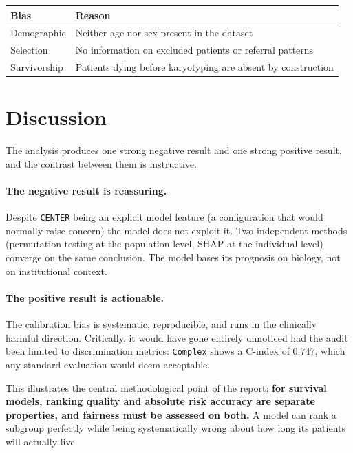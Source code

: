 \documentclass[11pt,a4paper]{article}
\newcommand{\var}[1]{\texttt{#1}}                      %
\begin{document}
\begin{table}[h]
\centering
\begin{tabular}{@{}p{4.5cm} p{9cm}@{}}
\toprule
\textbf{Bias} & \textbf{Reason} \\
\midrule
Demographic & Neither age nor sex present in the dataset \\
Selection & No information on excluded patients or referral patterns \\
Survivorship & Patients dying before karyotyping are absent by construction \\
\bottomrule
\end{tabular}
\end{table}

\section{Discussion}

The analysis produces one strong negative result and one strong positive result, and the
contrast between them is instructive.

\paragraph{The negative result is reassuring.}
Despite \var{CENTER} being an explicit model feature (a configuration that would normally
raise concern) the model does not exploit it. Two independent methods (permutation testing
at the population level, SHAP at the individual level) converge on the same conclusion. The
model bases its prognosis on biology, not on institutional context.

\paragraph{The positive result is actionable.}
The calibration bias is systematic, reproducible, and runs in the clinically harmful direction.
Critically, it would have gone entirely unnoticed had the audit been limited to discrimination
metrics: \var{Complex} shows a C-index of 0.747, which any standard evaluation would deem
acceptable.

This illustrates the central methodological point of the report: \textbf{for survival models,
ranking quality and absolute risk accuracy are separate properties, and fairness must be
assessed on both.} A model can rank a subgroup perfectly while being systematically wrong about
how long its patients will actually live.
\end{document}
